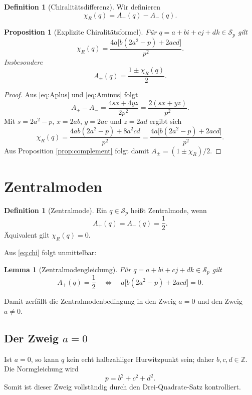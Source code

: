 \documentclass[11pt,a4paper]{article}
\newtheorem{lemma}[satz]{Lemma}
\newtheorem{proposition}[satz]{Proposition}
\theoremstyle{definition}
\newtheorem{definition}[satz]{Definition}
\newcommand{\ZZ}{\mathbb Z}
\begin{document}
\begin{definition}[Chiralitätsdifferenz]
Wir definieren
\[
\chi_R(q)=A_+(q)-A_-(q).
\]
\end{definition}

\begin{proposition}[Explizite Chiralitätsformel]\label{prop:chi}
Für $q=a+bi+cj+dk\in\mathcal S_p$ gilt
\begin{equation}\label{eq:chi}
\boxed{
\chi_R(q)=\frac{4a\bigl[b(2a^2-p)+2acd\bigr]}{p^2}.}
\end{equation}
Insbesondere
\[
A_\pm(q)=\frac{1\pm\chi_R(q)}2.
\]
\end{proposition}
\begin{proof}
Aus \eqref{eq:Aplus} und \eqref{eq:Aminus} folgt
\[
A_+-A_-=\frac{4sx+4yz}{2p^2}=\frac{2(sx+yz)}{p^2}.
\]
Mit $s=2a^2-p$, $x=2ab$, $y=2ac$ und $z=2ad$ ergibt sich
\[
\chi_R(q)
=\frac{4ab(2a^2-p)+8a^2cd}{p^2}
=\frac{4a\bigl[b(2a^2-p)+2acd\bigr]}{p^2}.
\]
Aus Proposition \ref{prop:complement} folgt damit $A_\pm=(1\pm\chi_R)/2$.
\end{proof}

\section{Zentralmoden}
\begin{definition}[Zentralmode]
Ein $q\in\mathcal S_p$ heißt Zentralmode, wenn
\[
A_+(q)=A_-(q)=\frac12.
\]
Äquivalent gilt $\chi_R(q)=0$.
\end{definition}

Aus \eqref{eq:chi} folgt unmittelbar:
\begin{lemma}[Zentralmodengleichung]\label{lem:central}
Für $q=a+bi+cj+dk\in\mathcal S_p$ gilt
\begin{equation}\label{eq:central}
A_+(q)=\frac12
\quad\Longleftrightarrow\quad
a\bigl[b(2a^2-p)+2acd\bigr]=0.
\end{equation}
\end{lemma}
Damit zerfällt die Zentralmodenbedingung in den Zweig $a=0$ und den Zweig $a\neq0$.

\subsection{Der Zweig $a=0$}
Ist $a=0$, so kann $q$ kein echt halbzahliger Hurwitzpunkt sein; daher $b,c,d\in\ZZ$. Die Normgleichung wird
\begin{equation}\label{eq:3branch}
p=b^2+c^2+d^2.
\end{equation}
Somit ist dieser Zweig vollständig durch den Drei-Quadrate-Satz kontrolliert.
\end{document}
